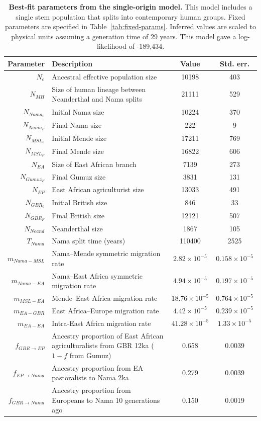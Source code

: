 \documentclass[]{article}
\begin{document}
\begin{table}[ht]
\caption{
    \label{tab:supp-single-origin}
    \textbf{Best-fit parameters from the single-origin model.}
    This model includes a single stem population that splits into contemporary human
    groups. Fixed parameters are specified in Table~\ref{tab:fixed-params}.
    Inferred values are scaled to physical units assuming a generation time of
    29 years. This model gave a log-likelihood of -189,434.
}
\centering
\begin{tabular}[t]{rP{8cm}cc}
    \toprule
    Parameter & Description & Value & Std. err.\\
    \midrule
    $N_e$ & Ancestral effective population size & 10198 & 403 \\
    $N_{MH}$ & Size of human lineage between Neanderthal and Nama splits & 21111 & 529 \\
    $N_{Nama_0}$ & Initial Nama size & 10224 & 370 \\
    $N_{Nama_F}$ & Final Nama size & 222 & 9 \\
    $N_{MSL_0}$ & Initial Mende size & 17211 & 769 \\
    $N_{MSL_F}$ & Final Mende size & 16822 & 606 \\
    $N_{EA}$ & Size of East African branch & 7139 & 273 \\
    $N_{Gumuz_F}$ & Final Gumuz size & 3831 & 131 \\
    $N_{EP}$ & East African agriculturist size & 13033 & 491 \\
    $N_{GBR_0}$ & Initial British size & 846 & 33 \\
    $N_{GBR_F}$ & Final British size & 12121 & 507 \\
    $N_{Neand}$ & Neanderthal size & 1867 & 105 \\
    $T_{Nama}$ & Nama split time (years) & 110400 & 2525 \\
    $m_{Nama-MSL}$ & Nama--Mende symmetric migration rate & $2.82\times10^{-5}$ & $0.158\times10^{-5}$ \\
    $m_{Nama-EA}$ & Nama--East Africa symmetric migration rate & $4.94\times10^{-5}$ & $0.197\times10^{-5}$ \\
    $m_{MSL-EA}$ & Mende--East Africa migration rate & $18.76\times10^{-5}$ & $0.764\times10^{-5}$ \\
    $m_{EA-GBR}$ & East Africa--Europe migration rate & $4.42\times10^{-5}$ & $0.239\times10^{-5}$ \\
    $m_{EA-EA}$ & Intra-East Africa migration rate & $41.28\times10^{-5}$ & $1.33\times10^{-5}$ \\
    $f_{GBR \rightarrow EP}$ & Ancestry proportion of East African agriculturalists from GBR 12ka ($1-f$ from Gumuz) & 0.658 & 0.0039 \\
    $f_{EP \rightarrow Nama}$ & Ancestry proportion from EA pastoralists to Nama 2ka & 0.279 & 0.0039 \\
    $f_{GBR \rightarrow Nama}$ & Ancestry proportion from Europeans to Nama 10 generations ago & 0.150 & 0.0019 \\
    \bottomrule
\end{tabular}
\end{table}
\end{document}

